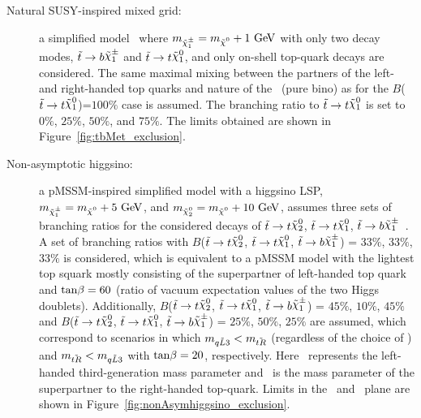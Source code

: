 			\begin{description}
			  \item[\boldmath Natural SUSY-inspired mixed grid:] a simplified model~\cite{Papucci2011} where $m_{\chinoonepm}=\mLSP+1\gev$ with only two decay modes, $\stop\to b \chinoonepm$ and $\stop\to t\LSP$, and only on-shell top-quark decays are considered. The same maximal mixing between the partners of the left- and right-handed top quarks and nature of the \LSP\ (pure bino) as for the $B$($\stop\to t\LSP$)=$100\%$ case is assumed. The branching ratio to $\stop\to t\LSP$ is set to $0\%$, $25\%$, $50\%$, and $75\%$. The limits obtained are shown in Figure~\ref{fig:tbMet_exclusion}.

				\item[\boldmath Non-asymptotic higgsino:] a \ac{pMSSM}-inspired simplified model with a higgsino \ac{LSP}, ${m_{\chinoonepm}=\mLSP+5\gev}$, and ${m_{\ninotwo}=\mLSP+10\gev}$, assumes three sets of branching ratios for the considered decays of $\stop\to t\ninotwo$, $\stop\to t\LSP$, $\stop\to b\chinoonepm$~\cite{Papucci2011}. A set of branching ratios with $B$($\stop\to t\ninotwo$, $\stop\to t\LSP$, $\stop\to b\chinoonepm$) = $33\%$, $33\%$, $33\%$ is considered, which is equivalent to a \ac{pMSSM} model with the lightest top squark mostly consisting of the superpartner of left-handed top quark and $\mathrm{tan}\beta=60$ (ratio of vacuum expectation values of the two Higgs doublets). Additionally, $B$($\stop\to t\ninotwo$, $\stop\to t\LSP$, $\stop\to b\chinoonepm$) = $45\%$, $10\%$, $45\%$ and $B$($\stop\to t\ninotwo$, $\stop\to t\LSP$, $\stop\to b\chinoonepm$) = $25\%$, $50\%$, $25\%$ are assumed, which correspond to scenarios in which $m_{\tilde{qL3}} < m_{\tilde{tR}}$ (regardless of the choice of \tanb) and $m_{\tilde{tR}}<m_{\tilde{qL3}}$ with $\mathrm{tan}\beta=20$, respectively. Here \mqlthree\ represents the left-handed third-generation mass parameter and \mtr\ is the mass parameter of the superpartner to the right-handed top-quark. Limits in the \mstop\ and \mLSP\ plane are shown in Figure~\ref{fig:nonAsymhiggsino_exclusion}.  


\end{description}
